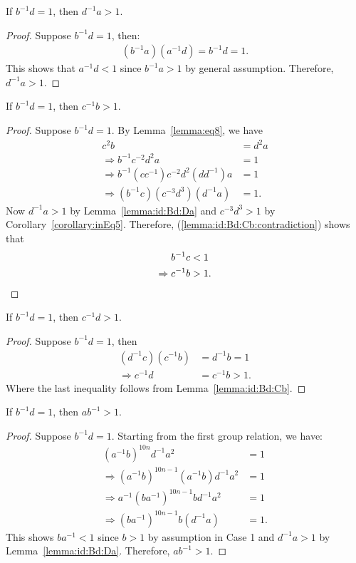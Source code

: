 \begin{lemma} If $b^{-1}d=1$, then $d^{-1}a>1$.
\label{lemma:id:Bd:Da}
\end{lemma}
\begin{proof} Suppose $b^{-1}d=1$, then:
\begin{align*}
(b^{-1}a)(a^{-1}d)=b^{-1}d=1.
\end{align*}
This shows that $a^{-1}d<1$ since $b^{-1}a>1$ by general assumption. Therefore, $d^{-1}a>1$.
\end{proof}

\begin{lemma} If $b^{-1}d=1$, then $c^{-1}b>1$.
\label{lemma:id:Bd:Cb}
\end{lemma}
\begin{proof} Suppose $b^{-1}d=1$. By Lemma~\ref{lemma:eq8}, we have
\begin{align}
c^{2}b&=d^{2}a\nonumber{}\\
\Rightarrow{}b^{-1}c^{-2}d^{2}a&=1\nonumber{}\\
\Rightarrow{}b^{-1}(cc^{-1})c^{-2}d^{2}(dd^{-1})a&=1\nonumber{}\\
\Rightarrow{}(b^{-1}c)(c^{-3}d^{3})(d^{-1}a)&=1.\label{lemma:id:Bd:Cb:contradiction}
\end{align}
Now $d^{-1}a>1$ by Lemma~\ref{lemma:id:Bd:Da} and $c^{-3}d^{3}>1$ by Corollary~\ref{corollary:inEq5}. Therefore, (\ref{lemma:id:Bd:Cb:contradiction}) shows that
\begin{align*}
b^{-1}c&<1\\
\Rightarrow{}c^{-1}b&>1.\qedhere
\end{align*}
\end{proof}

\begin{lemma} If $b^{-1}d=1$, then $c^{-1}d>1$.
\label{lemma:id:Bd:Cd}
\end{lemma}
\begin{proof} Suppose $b^{-1}d=1$, then
\begin{align*}
(d^{-1}c)(c^{-1}b)&=d^{-1}b=1\\
\Rightarrow{}c^{-1}d&=c^{-1}b>1.
\end{align*}
Where the last inequality follows from Lemma~\ref{lemma:id:Bd:Cb}.
\end{proof}

\begin{lemma} If $b^{-1}d=1$, then $ab^{-1}>1$.
\label{lemma:id:Bd:aB}
\end{lemma}
\begin{proof} Suppose $b^{-1}d=1$. Starting from the first group relation, we have:
\begin{align*}
(a^{-1}b)^{10n}d^{-1}a^{2}&=1\\
\Rightarrow{}(a^{-1}b)^{10n-1}(a^{-1}b)d^{-1}a^{2}&=1\\
\Rightarrow{}a^{-1}(ba^{-1})^{10n-1}bd^{-1}a^{2}&=1\\
\Rightarrow{}(ba^{-1})^{10n-1}b(d^{-1}a)&=1.
\end{align*}
This shows $ba^{-1}<1$ since $b>1$ by assumption in Case 1 and  $d^{-1}a>1$ by Lemma~\ref{lemma:id:Bd:Da}. Therefore, $ab^{-1}>1$.
\end{proof}

